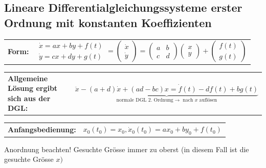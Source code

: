 \subsection{Lineare Differentialgleichungssysteme erster Ordnung mit konstanten Koeffizienten}
\begin{tabular}{ll}
\textbf{Form:}&
$\begin{array}{l}{\dot{x}=a x+b y+f(t)} \\ {\dot{y}=c x+d y+g(t)}\end{array}=\left(\begin{array}{c}{\dot{x}} \\ {\dot{y}}\end{array}\right)=\left(\begin{array}{ll}{a} & {b} \\ {c} & {d}\end{array}\right)\left(\begin{array}{l}{x} \\ {y}\end{array}\right)+\left(\begin{array}{l}{f(t)} \\ {g(t)}\end{array}\right)$\\
\end{tabular}

\begin{tabular}{ll}
\textbf{Allgemeine Lösung ergibt sich aus der DGL:}&
$\underbrace{\ddot{x}-(a+d) \dot{x}+(a d-b c) x=\dot{f}(t)-d f(t)+b g(t)}_{\text { normale DGL 2. Ordnung} \rightarrow \text { nach } x \text { auflösen }}$
\end{tabular}

\begin{tabular}{ll}
\textbf{Anfangsbedienung:}&
$x_{0}\left(t_{0}\right)=x_{0}, \dot{x}_{0}\left(t_{0}\right)=a x_{0}+b y_{0}+f\left(t_{0}\right)$
\end{tabular}

Anordnung beachten! Gesuchte Grösse immer zu oberst (in diesem Fall ist die gesuchte Grösse $x )$
